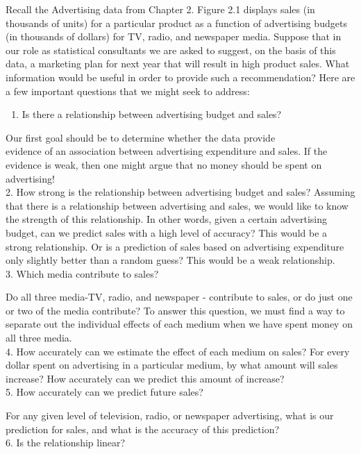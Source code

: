 \documentclass[10pt]{article}
\begin{document}
Recall the Advertising data from Chapter 2. Figure 2.1 displays sales (in thousands of units) for a particular product as a function of advertising budgets (in thousands of dollars) for TV, radio, and newspaper media. Suppose that in our role as statistical consultants we are asked to suggest, on the basis of this data, a marketing plan for next year that will result in high product sales. What information would be useful in order to provide such a recommendation? Here are a few important questions that we might seek to address:

\begin{enumerate}
  \item Is there a relationship between advertising budget and sales?
\end{enumerate}

Our first goal should be to determine whether the data provide\\
evidence of an association between advertising expenditure and sales. If the evidence is weak, then one might argue that no money should be spent on advertising!\\
2. How strong is the relationship between advertising budget and sales? Assuming that there is a relationship between advertising and sales, we would like to know the strength of this relationship. In other words, given a certain advertising budget, can we predict sales with a high level of accuracy? This would be a strong relationship. Or is a prediction of sales based on advertising expenditure only slightly better than a random guess? This would be a weak relationship.\\
3. Which media contribute to sales?

Do all three media-TV, radio, and newspaper - contribute to sales, or do just one or two of the media contribute? To answer this question, we must find a way to separate out the individual effects of each medium when we have spent money on all three media.\\
4. How accurately can we estimate the effect of each medium on sales? For every dollar spent on advertising in a particular medium, by what amount will sales increase? How accurately can we predict this amount of increase?\\
5. How accurately can we predict future sales?

For any given level of television, radio, or newspaper advertising, what is our prediction for sales, and what is the accuracy of this prediction?\\
6. Is the relationship linear?
\end{document}
